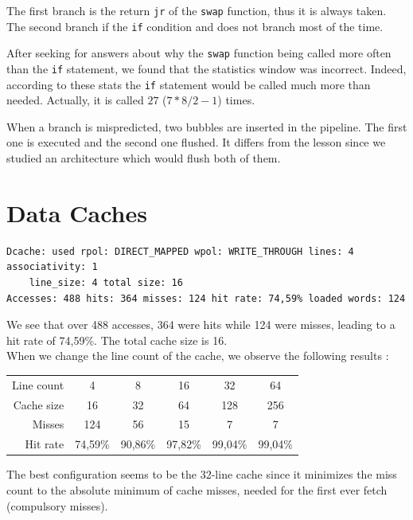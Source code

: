 \documentclass[a4paper]{report}
\begin{document}
The first branch is the return \texttt{jr} of the \texttt{swap} function, thus it is always taken. 
The second branch if the \texttt{if} condition and does not branch most of the time. 

After seeking for answers about why the \texttt{swap} function being called more often than the \texttt{if} statement, we found that the statistics window was incorrect. 
Indeed, according to these stats the \texttt{if} statement would be called much more than needed.
Actually, it is called $27$ ($7*8/2-1$) times.

When a branch is mispredicted, two bubbles are inserted in the pipeline. 
The first one is executed and the second one flushed.
It differs from the lesson since we studied an architecture which would flush both of them.

\section{Data Caches}

\begin{verbatim}
Dcache: used rpol: DIRECT_MAPPED wpol: WRITE_THROUGH lines: 4 associativity: 1
    line_size: 4 total size: 16
Accesses: 488 hits: 364 misses: 124 hit rate: 74,59% loaded words: 124
\end{verbatim}

We see that over 488 accesses, 364 were hits while 124 were misses, leading to a hit rate of 74,59\%. The
total cache size is 16.
\mbox{}\\

When we change the line count of the cache, we observe the following results :

\begin{center}
	\begin{tabular}{|r||c|c|c|c|c|}
		\hline
		Line count & 4 & 8 & 16 & 32 & 64 \\
		Cache size & 16 & 32 & 64 & 128 & 256 \\
		Misses     & 124 & 56 & 15 & 7 & 7 \\
		Hit rate   & 74,59\% & 90,86\% & 97,82\% & 99,04\% & 99,04\% \\
		\hline
	\end{tabular}
\end{center}

The best configuration seems to be the 32-line cache since it minimizes the miss count to the absolute minimum
of cache misses, needed for the first ever fetch (compulsory misses).
\mbox{}\\
\end{document}
